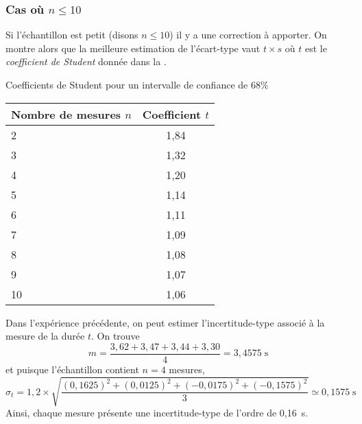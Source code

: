 \subsubsection{Cas où $n\leq 10$}
Si l'échantillon est petit (disons $n\leq 10$) il y a une correction à apporter. On montre alors que la meilleure estimation de l'écart-type vaut $t\times s$ où $t$ est le \emph{coefficient de Student} donnée dans la .
\begin{margintable}
	\caption{Coefficients de Student pour un intervalle de confiance de $68\%$}
	\footnotesize
	\begin{tabular}{@{}l|c@{}}
	\toprule
	Nombre de mesures $n$&	Coefficient $t$ \\
	\midrule
	2&	1,84\\
	3&	1,32\\
	4&	1,20\\
	5&	1,14\\
	6&	1,11\\
	7&	1,09\\
	8&	1,08\\
	9&	1,07\\
	10&	 1,06\\
	\bottomrule
	\end{tabular}
\end{margintable}
\begin{kaoexample}[frametitle=Exemple]
Dans l'expérience précédente, on peut estimer l'incertitude-type associé à la mesure de la durée $t$. On trouve 
	\[m=\dfrac{3,62+3,47+3,44+3,30}{4}=3,4575\;\mathrm{s}\]
	et puisque l'échantillon contient $n=4$ mesures, 
	\[\sigma_t=
	1,2\times\sqrt{\dfrac{(0,1625)^2+(0,0125)^2+(-0,0175)^2+(-0,1575)^2}{3}}\simeq0,1575\;\mathrm{s}\]
Ainsi, chaque mesure présente une incertitude-type de l'ordre de 0,16~s.
\end{kaoexample} 

